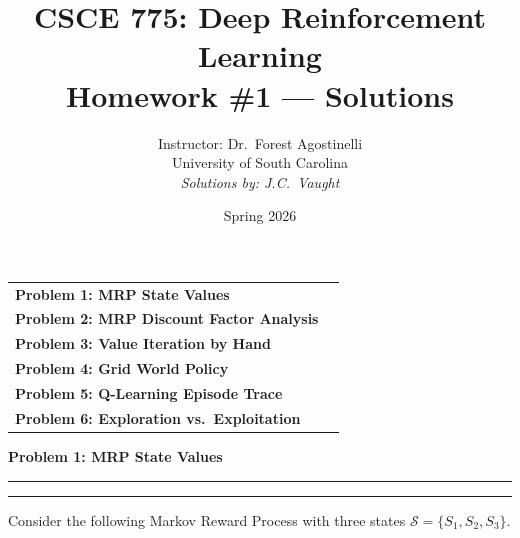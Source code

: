 \documentclass[12pt]{article}
\title{CSCE 775: Deep Reinforcement Learning \\ Homework \#1 --- Solutions}
\author{Instructor: Dr.\ Forest Agostinelli \\ University of South Carolina \\ \textit{Solutions by: J.C.\ Vaught}}
\date{Spring 2026}
\newcommand{\question}[1]{%
  \clearpage
  \vspace{0.5cm}
  {\noindent\normalsize \textbf{#1}}
  \vspace{0.2cm}
  \hrule
  \vspace{0.1cm}
  \hrule
  \vspace{0.3cm}
}
\begin{document}
\maketitle
\setlength{\parindent}{0pt}



\begin{center}
\begin{tcolorbox}[colback=white, colframe=gray!50!black, colbacktitle=gray!20!white,
                  coltitle=black, sharp corners, boxrule=1pt,
                  title=\Large\bfseries Table of Contents]
\begin{tabular}{p{}r}
\textbf{Problem 1: MRP State Values} \dotfill & \textbf{\pageref{prob:mrp}} \\[0.3em]
\textbf{Problem 2: MRP Discount Factor Analysis} \dotfill & \textbf{\pageref{prob:discount}} \\[0.3em]
\textbf{Problem 3: Value Iteration by Hand} \dotfill & \textbf{\pageref{prob:vi}} \\[0.3em]
\textbf{Problem 4: Grid World Policy} \dotfill & \textbf{\pageref{prob:grid}} \\[0.3em]
\textbf{Problem 5: Q-Learning Episode Trace} \dotfill & \textbf{\pageref{prob:qlearn}} \\[0.3em]
\textbf{Problem 6: Exploration vs.\ Exploitation} \dotfill & \textbf{\pageref{prob:explore}} \\
\end{tabular}
\vspace{0.2cm}
\end{tcolorbox}
\end{center}


\question{Problem 1: MRP State Values}\label{prob:mrp}

Consider the following Markov Reward Process with three states $\mathcal{S} = \{S_1, S_2, S_3\}$.
\end{document}
